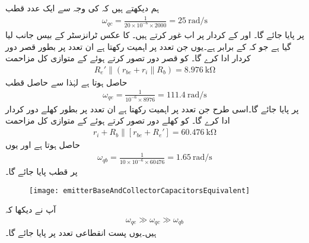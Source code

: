 ہم دیکھتے ہیں کہ  کی وجہ سے ایک عدد قطب
\begin{align*}
\omega_{qc}=\frac{1}{20 \times 10^{-6} \times 2000}=\SI[per=frac,fraction=nice]{25}{\radian \per \second}
\end{align*}
پر پایا جائے گا۔ اور  کے کردار پر اب غور کرتے ہیں۔ کا عکس ٹرانزسٹر کے بیس  جانب لیا گیا ہے جو کہ  کے برابر ہے۔یوں جن تعدد پر  اہمیت رکھتا ہے ان تعدد پر  بطور قصر دور کردار ادا کرے گا۔ کو قصر دور تصور کرتے ہوئے  کے متوازی کل مزاحمت
\begin{align*}
R_e' \mathbin{\|} \left(r_{be}+r_i \mathbin{\|} R_b \right)=\SI{8.976}{\kilo \ohm}
\end{align*} 
حاصل ہوتا ہے  لہٰذا  سے حاصل قطب
\begin{align*}
\omega_{qe}=\frac{1}{10^{-6} \times 8976}=\SI[per=frac,fraction=nice]{111.4}{\radian \per \second}
\end{align*}   
پر پایا جائے گا۔اسی طرح  جن تعدد پر  اہمیت رکھتا ہے ان تعدد پر  بطور کھلے دور کردار ادا کرے گا۔ کو کھلے دور تصور کرتے ہوئے  کے متوازی کل مزاحمت
\begin{align*}
r_i + R_b \mathbin{\|} \left[r_{be}+R_e' \right] =\SI{60.476}{\kilo \ohm}
\end{align*} 
حاصل ہوتا ہے اور یوں
\begin{align*}
\omega_{qb}=\frac{1}{10 \times 10^{-6} \times 60476}=\SI[per=frac,fraction=nice]{1.65}{\radian \per \second}
\end{align*}
پر قطب پایا جائے گا۔
%
\begin{figure}
\centering
\texttt{[image: emitterBaseAndCollectorCapacitorsEquivalent]}
\caption{}
\label{شکل_تعددی_ردعمل_سوال_قابو_مخارج_اور_محاصل_کپیسٹر_مساوی}
\end{figure}
آپ نے دیکھا کہ
\begin{align*}
\omega_{qe} \gg \omega_{qc} \gg \omega_{qb}
\end{align*}
ہیں۔یوں پست انقطاعی تعدد  پر پایا جائے گا۔

